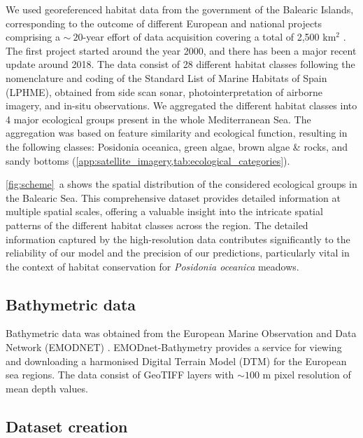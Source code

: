 We used georeferenced habitat data from the government of the Balearic
Islands, corresponding to the outcome of different European and national
projects comprising a $\sim~20$-year effort of data acquisition covering a
total of 2,500 km$^2$ \cite{cartografia,ValleVillalonga2023}. The first
project started around the year 2000, and there has been a major recent update
around 2018. The data consist of 28 different habitat classes following the
nomenclature and coding of the Standard List of Marine Habitats of Spain
(LPHME), obtained from side scan sonar, photointerpretation of airborne
imagery, and in-situ observations. We aggregated the different habitat classes
into 4 major ecological groups present in the whole Mediterranean Sea. The
aggregation was based on feature similarity and ecological function, resulting
in the following classes: Posidonia oceanica, green algae, brown algae \&
rocks, and sandy bottoms
(\cref{app:satellite_imagery,tab:ecological_categories}).

\cref{fig:scheme}~\textcolor{ref_color}{a} shows the spatial distribution of
the considered ecological
groups in the Balearic Sea. This comprehensive dataset provides detailed
information at multiple spatial scales, offering a valuable insight into the
intricate spatial patterns of the different habitat classes across the region.
The detailed information captured by the high-resolution data contributes
significantly to the reliability of our model and the precision of our
predictions, particularly vital in the context of habitat
conservation for \textit{Posidonia oceanica} meadows.

\subsection{Bathymetric data}

Bathymetric data was obtained from the European Marine Observation and Data
Network (EMODNET) \cite{emodnet}. EMODnet-Bathymetry provides a service for
viewing and downloading a harmonised Digital Terrain Model (DTM) for the
European sea regions. The data consist of GeoTIFF layers with $\sim100$ m pixel
resolution of mean depth values.

\subsection{Dataset creation}

